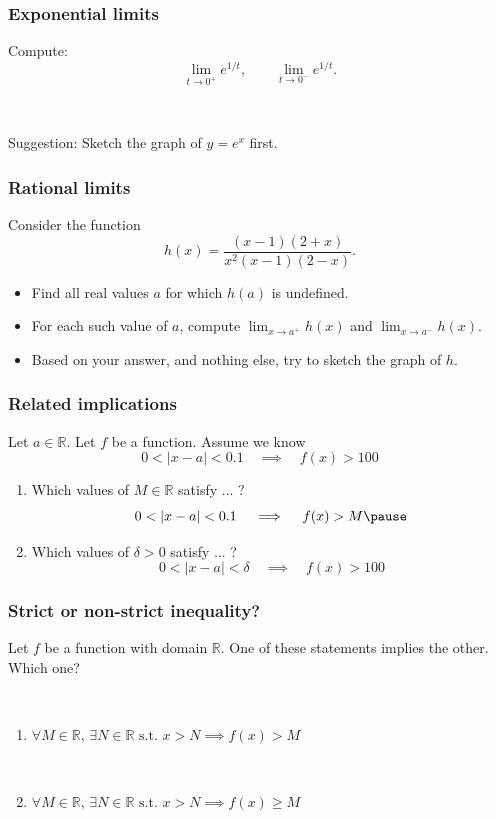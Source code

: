 \documentclass[14pt]{beamer}
\newcommand {\DS} [1] {${\displaystyle #1}$}
\newcommand {\R}{\mathbb{R}}
\newcommand{\p}{\pause}
\begin{document}
\begin{frame}
\frametitle{Exponential limits}

Compute:
	$$
		\lim_{t \to 0^+} e^{1/t}, \quad \quad \lim_{t \to 0^-} e^{1/t}.
	$$

\

Suggestion:  Sketch the graph of \DS{y=e^x} first.	

\end{frame}
\begin{frame}[t]
\frametitle{Rational limits}

Consider the function
	$$
		h(x) = \frac{(x-1)(2+x)}{x^2(x-1)(2-x)}.
	$$
\begin{itemize}
	\item Find all real values $a$ for which $h(a)$ is undefined. \\
	\item For each such value of $a$, compute \DS{\lim_{x \to a^+} h(x)} and \DS{\lim_{x \to a^-}h(x)}. \\
	\item Based on your answer, and nothing else, try to sketch the graph of $h$.	
\end{itemize}

\end{frame}
\begin{frame}[t]
\frametitle{Related implications}


Let $a \in \R$.  Let $f$ be a function.
Assume we know 
	$$
		0 < |x-a| < 0.1 \quad \implies \quad f(x) > 100
	$$
\vspace{-.5cm}
\begin{enumerate}
	\item  Which values of $M \in \R$ satisfy ... ?
		$$
			0 < |x-a| < 0.1 \quad \implies \quad f(x) > M \p
		$$
\vspace{-.5cm}
	\item  Which values of $\delta>0$ satisfy ... ?
		$$
				0 < |x-a| < \delta \quad \implies \quad f(x) > 100
		$$
\end{enumerate}	


\end{frame}
\begin{frame}
\frametitle{Strict or non-strict inequality?}

	Let $f$ be a function with domain $\R$.  One of these statements implies the other.  Which one?

\
	\begin{enumerate}
		\item  \DS{\forall M \in \R, \, \exists N \in \R \mbox{ s.t. }  x>N \implies f(x) > M}

\
		\item  \DS{\forall M \in \R, \, \exists N \in \R \mbox{ s.t. }  x>N \implies f(x) \geq M}
	\end{enumerate}


\end{frame}
\end{document}
